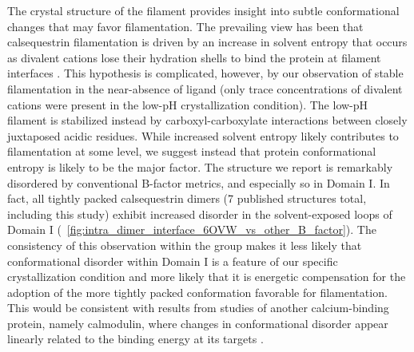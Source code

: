 The crystal structure of the filament provides insight into subtle conformational changes that may favor filamentation. The prevailing view has been that calsequestrin filamentation is driven by an increase in solvent entropy that occurs as divalent cations lose their hydration shells to bind the protein at filament interfaces \supercite{Krause1991-le}. This hypothesis is complicated, however, by our observation of stable filamentation in the near-absence of ligand (only trace concentrations of divalent cations were present in the low-pH crystallization condition). The low-pH filament is stabilized instead by carboxyl-carboxylate interactions between closely juxtaposed acidic residues. While increased solvent entropy likely contributes to filamentation at some level, we suggest instead that protein conformational entropy is likely to be the major factor. The structure we report is remarkably disordered by conventional B-factor metrics, and especially so in Domain I. In fact, all tightly packed calsequestrin dimers (7 published structures total, including this study) exhibit increased disorder in the solvent-exposed loops of Domain I (\extendeddatafigure~\ref{fig:intra_dimer_interface_6OVW_vs_other_B_factor}). The consistency of this observation within the group makes it less likely that conformational disorder within Domain I is a feature of our specific crystallization condition and more likely that it is energetic compensation for the adoption of the more tightly packed conformation favorable for filamentation. This would be consistent with results from studies of another calcium-binding protein, namely calmodulin, where changes in conformational disorder appear linearly related to the binding energy at its targets \supercite{Frederick2007-in}. %

